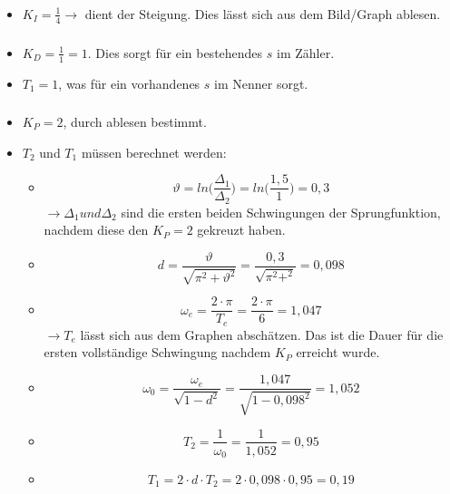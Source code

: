 \documentclass{article}
\begin{document}
			\subsubsection{}
				\begin{itemize}
					\item $K_I = \frac{1}{4} \rightarrow$ dient der Steigung. Dies lässt sich aus dem Bild/Graph ablesen.
				\end{itemize}
			\subsubsection{}
				\begin{itemize}
					\item $K_D = \frac{1}{1} = 1$. Dies sorgt für ein bestehendes $s$ im Zähler.
					\item $T_1 = 1$, was für ein vorhandenes $s$ im Nenner sorgt.
				\end{itemize}
			\subsubsection{}
				\begin{itemize}
					\item $K_P = 2$, durch ablesen bestimmt.
					\item $T_2$ und $T_1$ müssen berechnet werden:
						\begin{itemize}
							\item $$\vartheta  = ln\Big(\frac{\Delta_1}{\Delta_2} \Big) = ln \Big(\frac{1,5}{1}\Big) = 0,3$$ $\rightarrow \Delta_1 und \Delta_2$ sind die ersten beiden Schwingungen der Sprungfunktion, nachdem diese den $K_P = 2$ gekreuzt haben.
							\item $$d = \frac{\vartheta}{\sqrt{\pi^2 + \vartheta^2}} = \frac{0,3}{\sqrt{\pi^2 + ^2}} = 0,098$$
							\item $$\omega_e = \frac{2\cdot \pi}{T_e} = \frac{2\cdot \pi}{6} = 1,047$$ $\rightarrow T_e$ lässt sich aus dem Graphen abschätzen. Das ist die Dauer für die ersten vollständige Schwingung nachdem $K_P$ erreicht wurde.
							\item $$\omega_0 = \frac{\omega_e}{\sqrt{1 - d^2}} = \frac{1,047}{\sqrt{1 - 0,098^2}} = 1,052$$ 
							\item $$T_2 = \frac{1}{\omega_0} = \frac{1}{1,052} = 0,95$$
							\item $$T_1 = 2\cdot d \cdot T_2 = 2 \cdot 0,098 \cdot 0,95 = 0,19$$
						\end{itemize}
				\end{itemize}
\end{document}
